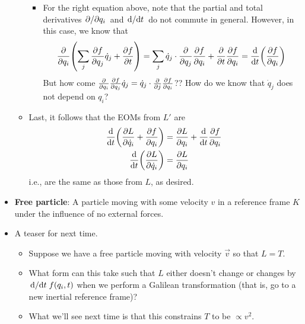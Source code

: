 \documentclass[../notes.tex]{subfiles}
\begin{document}
\begin{itemize}
\begin{itemize}
\begin{itemize}
            \item For the right equation above, note that the partial and total derivatives $\pdv*{q_i}$ and $\dv*{t}$ do not commute in general. However, in this case, we know that
            \begin{equation*}
                \pdv{q_i}(\sum_j\pdv{f}{q_j}\dot{q}_j+\pdv{f}{t}) = \sum_j\dot{q}_j\cdot\pdv{q_j}\pdv{f}{q_i}+\pdv{t}\pdv{f}{q_i}
                = \dv{t}(\pdv{f}{q_i})
            \end{equation*}
            But how come $\pdv{q_i}\pdv{f}{q_j}\dot{q}_j=\dot{q}_j\cdot\pdv{j}\pdv{f}{q_i}$?? How do we know that $\dot{q}_j$ does not depend on $q_i$?
        \end{itemize}
        \item Last, it follows that the EOMs from $L'$ are
        \begin{align*}
            \dv{t}(\pdv{L}{\dot{q}_i}+\pdv{f}{q_i}) &= \pdv{L}{q_i}+\dv{t}\pdv{f}{q_i}\\
            \dv{t}(\pdv{L}{\dot{q}_i}) &= \pdv{L}{q_i}
        \end{align*}
        i.e., are the same as those from $L$, as desired.
    \end{itemize}
    \item \textbf{Free particle}: A particle moving with some velocity $v$ in a reference frame $K$ under the influence of no external forces.
    \item A teaser for next time.
    \begin{itemize}
        \item Suppose we have a free particle moving with velocity $\vec{v}$ so that $L=T$.
        \item What form can this take such that $L$ either doesn't change or changes by $\dv*{t}f(q_i,t)$ when we perform a Galilean transformation (that is, go to a new inertial reference frame)?
        \item What we'll see next time is that this constrains $T$ to be $\propto v^2$.
    \end{itemize}
\end{itemize}
\end{document}
